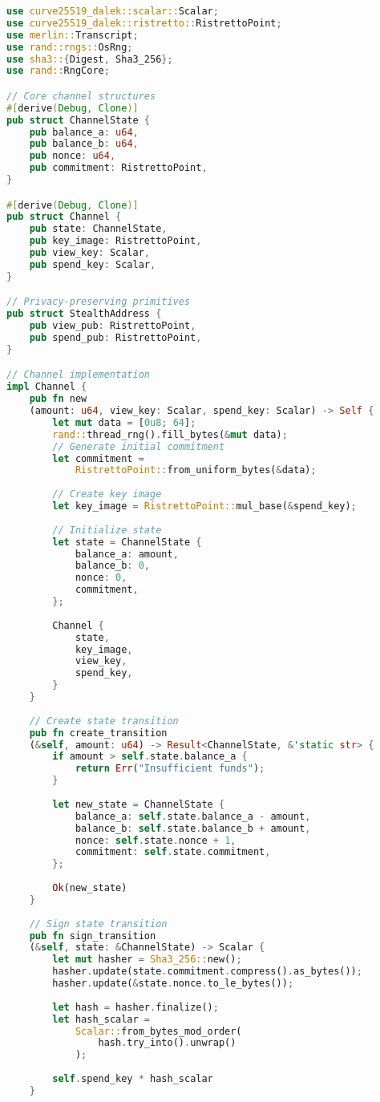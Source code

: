 \documentclass[11pt]{amsart}
\begin{document}
\begin{lstlisting}[language=Rust]
use curve25519_dalek::scalar::Scalar;
use curve25519_dalek::ristretto::RistrettoPoint;
use merlin::Transcript;
use rand::rngs::OsRng;
use sha3::{Digest, Sha3_256};
use rand::RngCore;

// Core channel structures
#[derive(Debug, Clone)]
pub struct ChannelState {
	pub balance_a: u64,
	pub balance_b: u64,
	pub nonce: u64,
	pub commitment: RistrettoPoint,
}

#[derive(Debug, Clone)]
pub struct Channel {
	pub state: ChannelState,
	pub key_image: RistrettoPoint,
	pub view_key: Scalar,
	pub spend_key: Scalar,
}

// Privacy-preserving primitives
pub struct StealthAddress {
	pub view_pub: RistrettoPoint,
	pub spend_pub: RistrettoPoint,
}

// Channel implementation
impl Channel {
	pub fn new
	(amount: u64, view_key: Scalar, spend_key: Scalar) -> Self {
		let mut data = [0u8; 64];
		rand::thread_rng().fill_bytes(&mut data);
		// Generate initial commitment
		let commitment = 
			RistrettoPoint::from_uniform_bytes(&data);
		
		// Create key image
		let key_image = RistrettoPoint::mul_base(&spend_key);
		
		// Initialize state
		let state = ChannelState {
			balance_a: amount,
			balance_b: 0,
			nonce: 0,
			commitment,
		};
		
		Channel {
			state,
			key_image,
			view_key,
			spend_key,
		}
	}
	
	// Create state transition
	pub fn create_transition
	(&self, amount: u64) -> Result<ChannelState, &'static str> {
		if amount > self.state.balance_a {
			return Err("Insufficient funds");
		}
		
		let new_state = ChannelState {
			balance_a: self.state.balance_a - amount,
			balance_b: self.state.balance_b + amount,
			nonce: self.state.nonce + 1,
			commitment: self.state.commitment,
		};
		
		Ok(new_state)
	}
	
	// Sign state transition
	pub fn sign_transition
	(&self, state: &ChannelState) -> Scalar {
		let mut hasher = Sha3_256::new();
		hasher.update(state.commitment.compress().as_bytes());
		hasher.update(&state.nonce.to_le_bytes());
		
		let hash = hasher.finalize();
		let hash_scalar = 	
			Scalar::from_bytes_mod_order(
				hash.try_into().unwrap()
			);
		
		self.spend_key * hash_scalar
	}
	

\end{lstlisting}
\end{document}
